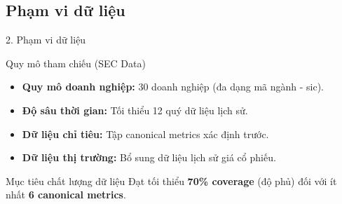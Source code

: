 \documentclass[t, aspectratio=169]{beamer} %
\begin{document}
	\subsection{Phạm vi dữ liệu}
	\begin{frame}{2. Phạm vi dữ liệu}
		\begin{block}{Quy mô tham chiếu (SEC Data)}
			\begin{itemize}
				\item \textbf{Quy mô doanh nghiệp:} 30 doanh nghiệp (đa dạng mã ngành - sic).
				\item \textbf{Độ sâu thời gian:} Tối thiểu 12 quý dữ liệu lịch sử.
				\item \textbf{Dữ liệu chỉ tiêu:} Tập canonical metrics xác định trước.
				\item \textbf{Dữ liệu thị trường:} Bổ sung dữ liệu lịch sử giá cổ phiếu.
			\end{itemize}
		\end{block}
		
		\vspace{1em}
		
		\begin{alertblock}{Mục tiêu chất lượng dữ liệu}
			Đạt tối thiểu \textbf{70\% coverage} (độ phủ) đối với ít nhất \textbf{6 canonical metrics}.
		\end{alertblock}
	\end{frame}
	
	\hustthankyou
	
\end{document}
